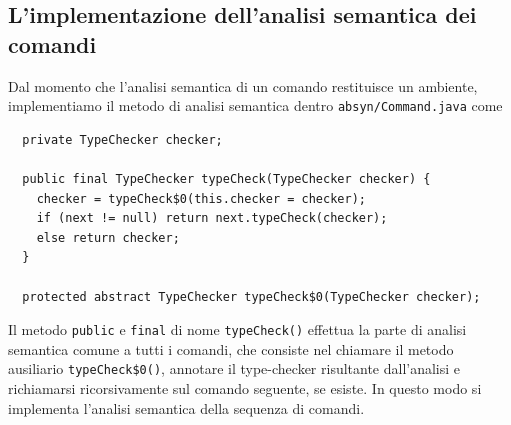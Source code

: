 \subsection{L'implementazione dell'analisi semantica dei comandi}
  \label{subsec:analysis_commands_implementation}
%
Dal momento
che l'analisi semantica di un comando restituisce un ambiente, implementiamo
il metodo di analisi semantica dentro \texttt{absyn/Command.java} come
%
\begin{verbatim}
  private TypeChecker checker;

  public final TypeChecker typeCheck(TypeChecker checker) {
    checker = typeCheck$0(this.checker = checker);
    if (next != null) return next.typeCheck(checker);
    else return checker;
  }

  protected abstract TypeChecker typeCheck$0(TypeChecker checker);
\end{verbatim}
%
Il metodo \texttt{public} e \texttt{final} di nome \texttt{typeCheck()}
effettua la parte di analisi semantica comune a tutti i comandi, che consiste
nel chiamare il metodo ausiliario \texttt{typeCheck\$0()}, annotare il
type-checker risultante dall'analisi e richiamarsi ricorsivamente sul
comando seguente, se esiste. In questo modo si implementa l'analisi
semantica della sequenza di comandi.

